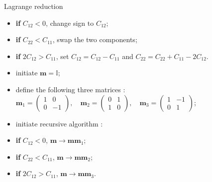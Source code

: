\documentclass[10pt, aspectratio=169]{beamer}
\begin{document}
\begin{frame}{Lagrange reduction}
    
    \vspace{0.4cm}
    \begin{itemize}
        \setlength\itemsep{0.3cm}
        \item \textbf{if} $C_{12} < 0$, change sign to $C_{12}$;
        \item \textbf{if} $C_{22} < C_{11}$, swap the two components;
        \item \textbf{if} $2C_{12} > C_{11}$, set $C_{12} = C_{12} - C_{11}$ and $C_{22} = C_{22} + C_{11} - 2C_{12}$.
    \end{itemize}
    
    \vspace{0.8cm}
    \begin{itemize}
        \setlength\itemsep{0.3cm}
        \item initiate $\mathbf{m} = \mathbb{I}$;
        \item define the following three matrices : \quad
              $\displaystyle \mathbf{m}_1 = \begin{pmatrix} 1 & 0 \\ 0 & -1 \end{pmatrix}, \quad \mathbf{m}_2 = \begin{pmatrix} 0 & 1 \\ 1 & 0 \end{pmatrix}, \quad \mathbf{m}_3 = \begin{pmatrix} 1 & -1 \\ 0 & 1 \end{pmatrix}$;
        \item initiate recursive algorithm :
        \item \textbf{if} $C_{12} < 0$, \quad $\mathbf{m} \rightarrow \mathbf{m}\mathbf{m}_1$;
        \item \textbf{if} $C_{22} < C_{11}$, \quad $\mathbf{m} \rightarrow \mathbf{m}\mathbf{m}_2$;
        \item \textbf{if} $2C_{12} > C_{11}$, \quad $\mathbf{m} \rightarrow \mathbf{m}\mathbf{m}_3$.
    \end{itemize}
    
\end{frame}
\end{document}
